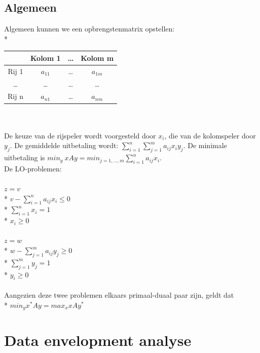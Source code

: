 \documentclass[10pt]{article}
\begin{document}
\subsection{Algemeen}
Algemeen kunnen we een opbrengstenmatrix opstellen:\\*
\begin{tabular}{| c | c | c | c |}
\hline
 & Kolom 1 & \dots & Kolom m \\ \hline
Rij 1 & $a_{11}$ & \dots & $a_{1m}$ \\ \hline
\dots & \dots & \dots & \dots \\ \hline
Rij n & $a_{n1}$ & \dots & $a_{nm}$ \\ \hline
\end{tabular}\\\\
De keuze van de rijspeler wordt voorgesteld door $x_i$, die van de kolomspeler door $y_j$. De gemiddelde uitbetaling wordt: $\sum_{i=1}^n\sum_{j=1}^ma_{ij}x_iy_j$. De minimale uitbetaling is $min_y\ xAy = min_{j=1,\dots,m}\sum_{i=1}^na_{ij}x_i$.\\
De LO-problemen:\\\\
$z = v$\\*
$v - \sum_{i=1}^na_{ij}x_i \le 0$\\*
$\sum_{i=1}^nx_i = 1$\\*
$x_i \ge 0$\\\\
$z = w$\\*
$w - \sum_{j=1}^ma_{ij}y_j \ge 0$\\*
$\sum_{j=1}^my_j = 1$\\*
$y_i \ge 0$\\\\
Aangezien deze twee problemen elkaars primaal-duaal paar zijn, geldt dat\\*
$min_yx^*Ay = max_xxAy^*$
\section{Data envelopment analyse}
\end{document}
